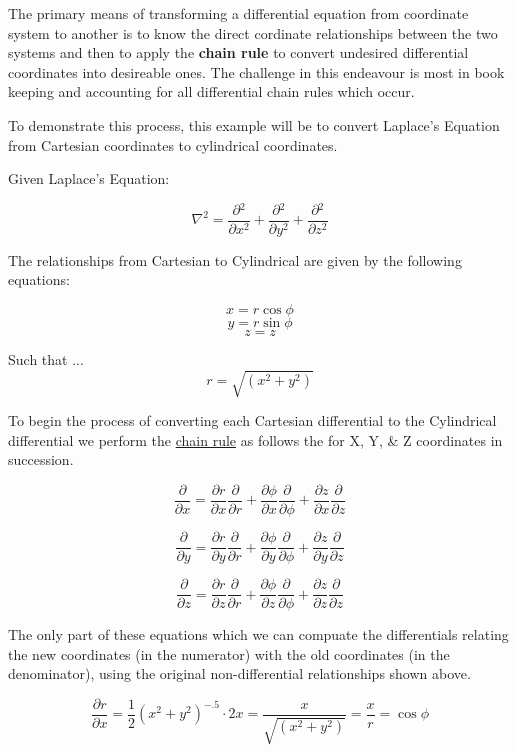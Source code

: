 \documentclass[12pt]{article}
\begin{document}
The primary means of transforming a differential equation from coordinate system to another is to know the direct cordinate relationships between the two systems and then to apply the \textbf{chain rule} to convert undesired differential coordinates into desireable ones. The challenge in this endeavour is most in book keeping and accounting for all differential chain rules which occur.

To demonstrate this process, this example will be to convert Laplace's Equation from Cartesian coordinates to cylindrical coordinates. \newline{}

Given Laplace's Equation:

\[ \nabla^2 = \frac{\partial{}^2}{\partial{x^2}} + \frac{\partial{}^2}{\partial{y^2}} + \frac{\partial{}^2}{\partial{z^2}} \]

The relationships from Cartesian to Cylindrical are given by the following equations:

\[ x = r\cos{\phi}\]
\[ y = r\sin{\phi}\]
\[ z = z \]

Such that ...
\[ r = \sqrt{(x^2 + y^2)}\]


To begin the process of converting each Cartesian differential to the Cylindrical differential we perform the \underline{chain rule} as follows the for X, Y, \& Z coordinates in succession.

\[ \frac{\partial{}}{\partial{x}} = \frac{\partial{r}}{\partial{x}}\frac{\partial{}}{\partial{r}} + \frac{\partial{\phi}}{\partial{x}}\frac{\partial{}}{\partial{\phi}} +\frac{\partial{z}}{\partial{x}}\frac{\partial{}}{\partial{z}} \]

\[ \frac{\partial{}}{\partial{y}} = \frac{\partial{r}}{\partial{y}}\frac{\partial{}}{\partial{r}} + \frac{\partial{\phi}}{\partial{y}}\frac{\partial{}}{\partial{\phi}} +\frac{\partial{z}}{\partial{y}}\frac{\partial{}}{\partial{z}} \]

\[ \frac{\partial{}}{\partial{z}} = \frac{\partial{r}}{\partial{z}}\frac{\partial{}}{\partial{r}} + \frac{\partial{\phi}}{\partial{z}}\frac{\partial{}}{\partial{\phi}} +\frac{\partial{z}}{\partial{z}}\frac{\partial{}}{\partial{z}} \]


\pagebreak

The only part of these equations which we can compuate the differentials relating the new coordinates (in the numerator) with the old coordinates (in the denominator), using the original non-differential relationships shown above.


\[ \frac{\partial{r}}{\partial{x}} = \frac{1}{2}(x^2 + y^2)^{-.5} \cdot 2x = \frac{x}{\sqrt{(x^2 + y^2)}} = \frac{x}{r} = \cos{\phi}\]
\end{document}
